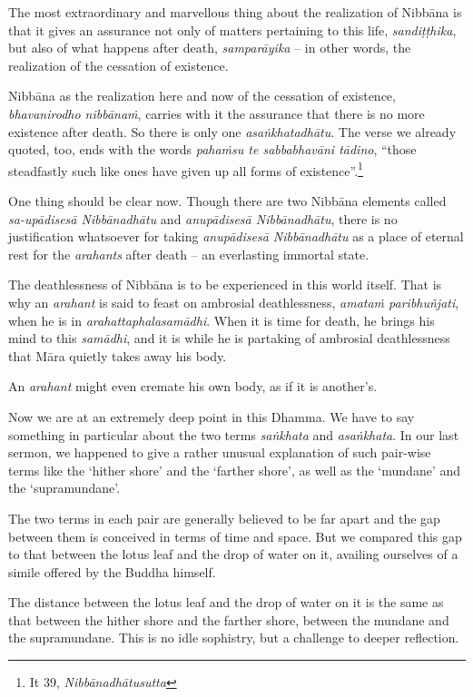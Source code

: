 The most extraordinary and marvellous thing about the realization of Nibbāna is that it gives an assurance not only of matters pertaining to this life, \emph{sandiṭṭhika}, but also of what happens after death, \emph{samparāyika} -- in other words, the realization of the cessation of existence.

Nibbāna as the realization here and now of the cessation of existence, \emph{bhavanirodho nibbānaṁ}, carries with it the assurance that there is no more existence after death. So there is only one \emph{asaṅkhatadhātu}. The verse we already quoted, too, ends with the words \emph{pahaṁsu te sabbabhavāni tādino}, ``those steadfastly such like ones have given up all forms of existence''.\footnote{It 39, \emph{Nibbānadhātusutta}}

One thing should be clear now. Though there are two Nibbāna elements called \emph{sa-upādisesā Nibbānadhātu} and \emph{anupādisesā Nibbānadhātu}, there is no justification whatsoever for taking \emph{anupādisesā Nibbānadhātu} as a place of eternal rest for the \emph{arahants} after death -- an everlasting immortal state.

The deathlessness of Nibbāna is to be experienced in this world itself. That is why an \emph{arahant} is said to feast on ambrosial deathlessness, \emph{amataṁ paribhuñjati}, when he is in \emph{arahattaphalasamādhi}. When it is time for death, he brings his mind to this \emph{samādhi}, and it is while he is partaking of ambrosial deathlessness that Māra quietly takes away his body.

An \emph{arahant} might even cremate his own body, as if it is another's.

Now we are at an extremely deep point in this Dhamma. We have to say something in particular about the two terms \emph{saṅkhata} and \emph{asaṅkhata}. In our last sermon, we happened to give a rather unusual explanation of such pair-wise terms like the `hither shore' and the `farther shore', as well as the `mundane' and the `supramundane'.

The two terms in each pair are generally believed to be far apart and the gap between them is conceived in terms of time and space. But we compared this gap to that between the lotus leaf and the drop of water on it, availing ourselves of a simile offered by the Buddha himself.

The distance between the lotus leaf and the drop of water on it is the same as that between the hither shore and the farther shore, between the mundane and the supramundane. This is no idle sophistry, but a challenge to deeper reflection.

